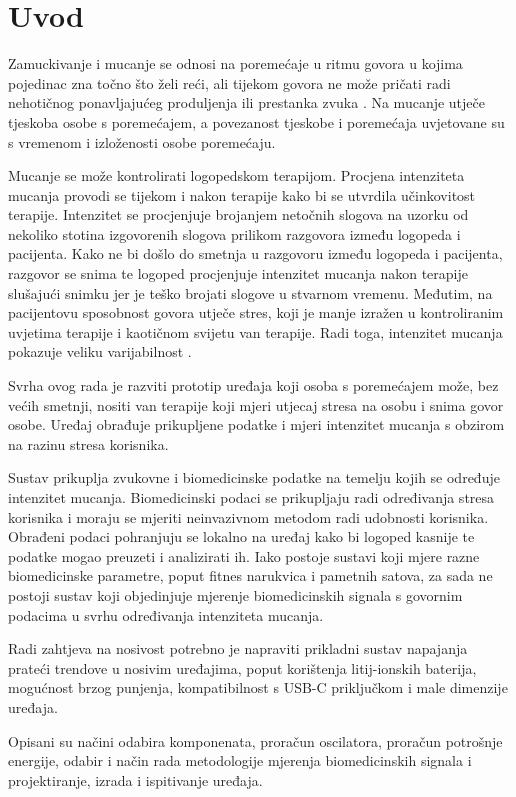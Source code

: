\chapter{Uvod}
\label{pog:uvod}

Zamuckivanje i mucanje se odnosi na poremećaje u ritmu govora u kojima pojedinac zna točno što želi reći, ali tijekom govora ne može pričati radi nehotičnog ponavljajućeg produljenja ili prestanka zvuka \cite{who}. Na mucanje utječe tjeskoba osobe s poremećajem, a povezanost tjeskobe i poremećaja uvjetovane su s vremenom i izloženosti osobe poremećaju.

Mucanje se može kontrolirati logopedskom terapijom. Procjena intenziteta mucanja provodi se tijekom i nakon terapije kako bi se utvrdila učinkovitost terapije. Intenzitet se procjenjuje brojanjem netočnih slogova na uzorku od nekoliko stotina izgovorenih slogova prilikom razgovora između logopeda i pacijenta. Kako ne bi došlo do smetnja u razgovoru između logopeda i pacijenta, razgovor se snima te logoped procjenjuje intenzitet mucanja nakon terapije slušajući snimku jer je teško brojati slogove u stvarnom vremenu. Međutim, na pacijentovu sposobnost govora utječe stres, koji je manje izražen u kontroliranim uvjetima terapije i kaotičnom svijetu van terapije. Radi toga, intenzitet mucanja pokazuje veliku varijabilnost \cite{TICHENOR2015}.

Svrha ovog rada je razviti prototip uređaja koji osoba s poremećajem može, bez većih smetnji, nositi van terapije koji mjeri utjecaj stresa na osobu i snima govor osobe. Uređaj obrađuje prikupljene podatke i mjeri intenzitet mucanja s obzirom na razinu stresa korisnika.

Sustav prikuplja zvukovne i biomedicinske podatke na temelju kojih se određuje intenzitet mucanja. Biomedicinski podaci se prikupljaju radi određivanja stresa korisnika i moraju se mjeriti neinvazivnom metodom radi udobnosti korisnika. Obrađeni podaci pohranjuju se lokalno na uređaj kako bi logoped kasnije te podatke mogao preuzeti i analizirati ih. Iako postoje sustavi koji mjere razne biomedicinske parametre, poput fitnes narukvica i pametnih satova, za sada ne postoji sustav koji objedinjuje mjerenje biomedicinskih signala s govornim podacima u svrhu određivanja intenziteta mucanja.

Radi zahtjeva na nosivost potrebno je napraviti prikladni sustav napajanja prateći trendove u nosivim uređajima, poput korištenja litij-ionskih baterija, mogućnost brzog punjenja, kompatibilnost s USB-C priključkom i male dimenzije uređaja.

Opisani su načini odabira komponenata, proračun oscilatora, proračun potrošnje energije, odabir i način rada metodologije mjerenja biomedicinskih signala i projektiranje, izrada i ispitivanje uređaja.